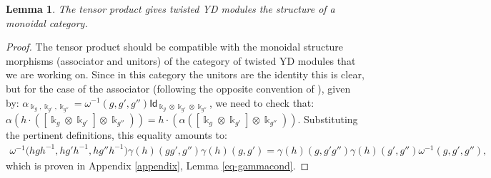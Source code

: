 \documentclass[10pt,a4paper]{amsart}
\numberwithin{equation}{section}
\newtheorem{Lemma}[Theorem]{Lemma}
\newcommand{\ide}{\mathsf{Id}}
\begin{document}
 \begin{Lemma}
 The tensor product gives twisted YD modules the structure of a monoidal category.
 \end{Lemma}
 \begin{proof}
 The tensor product should be compatible with the monoidal structure morphisms (associator and unitors) of the category of twisted YD modules that we are working on.
 Since in this category the unitors are the identity this is clear, but for the case of the associator (following the opposite convention of \cite{EGNO}), given by:
$\alpha_{\Bbbk_g,\Bbbk_{g'},\Bbbk_{g''}}=\omega^{-1}(g,g',g'') \ide_{\Bbbk_g \otimes \Bbbk_{g'} \otimes \Bbbk_{g''}}$, we need to check that: $\alpha ( h \cdot ( [ \Bbbk_g \otimes \Bbbk_{g'} ] \otimes \Bbbk_{g''} ) )=h \cdot ( \alpha ( [ \Bbbk_g \otimes \Bbbk_{g'} ] \otimes \Bbbk_{g''} ) )$. Substituting the pertinent definitions, this equality amounts to:
\begin{gather*}
\omega^{-1}\!\big(hgh^{-1}\!,hg'h^{-1}\!,hg''h^{-1}\big) \gamma(h)(gg'\!,g'') \gamma(h)(g,g')=\gamma(h)(g,g'g'') \gamma(h)(g'\!,g'') \omega^{-1}(g,g'\!,g''),
\end{gather*}
which is proven in Appendix \ref{appendix}, Lemma \ref{eq-gammacond}. \end{proof}
\end{document}
